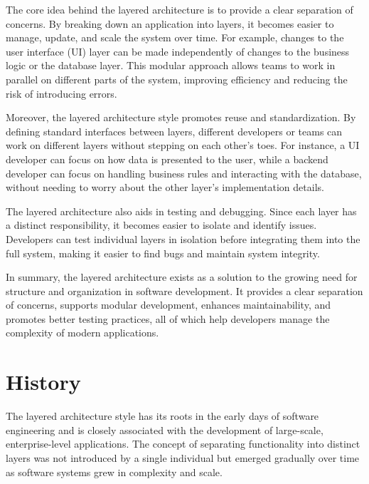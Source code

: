 The core idea behind the layered architecture is to provide a clear separation of concerns. By breaking down an application into layers, it becomes easier to manage, update, and scale the system over time. For example, changes to the user interface (UI) layer can be made independently of changes to the business logic or the database layer. This modular approach allows teams to work in parallel on different parts of the system, improving efficiency and reducing the risk of introducing errors.

Moreover, the layered architecture style promotes reuse and standardization. By defining standard interfaces between layers, different developers or teams can work on different layers without stepping on each other’s toes. For instance, a UI developer can focus on how data is presented to the user, while a backend developer can focus on handling business rules and interacting with the database, without needing to worry about the other layer's implementation details.

The layered architecture also aids in testing and debugging. Since each layer has a distinct responsibility, it becomes easier to isolate and identify issues. Developers can test individual layers in isolation before integrating them into the full system, making it easier to find bugs and maintain system integrity.

In summary, the layered architecture exists as a solution to the growing need for structure and organization in software development. It provides a clear separation of concerns, supports modular development, enhances maintainability, and promotes better testing practices, all of which help developers manage the complexity of modern applications.

\section{History}

The layered architecture style has its roots in the early days of software engineering and is closely associated with the development of large-scale, enterprise-level applications. The concept of separating functionality into distinct layers was not introduced by a single individual but emerged gradually over time as software systems grew in complexity and scale. 

